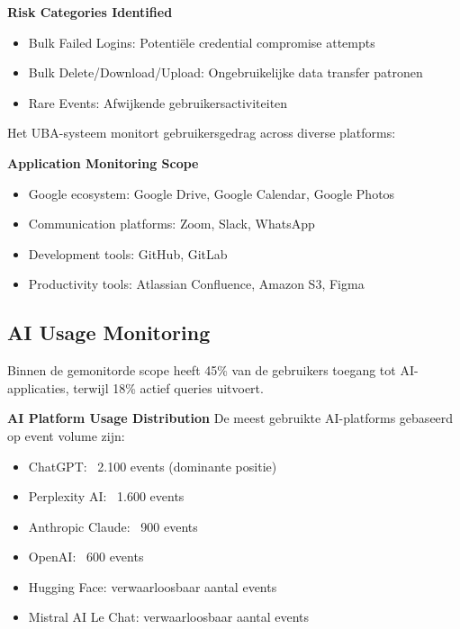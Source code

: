 \textbf{Risk Categories Identified}
\begin{itemize}
    \item Bulk Failed Logins: Potentiële credential compromise attempts
    \item Bulk Delete/Download/Upload: Ongebruikelijke data transfer patronen
    \item Rare Events: Afwijkende gebruikersactiviteiten
\end{itemize}

\vspace{2ex}

Het UBA-systeem monitort gebruikersgedrag across diverse platforms:

\textbf{Application Monitoring Scope}
\begin{itemize}
    \item Google ecosystem: Google Drive, Google Calendar, Google Photos
    \item Communication platforms: Zoom, Slack, WhatsApp
    \item Development tools: GitHub, GitLab
    \item Productivity tools: Atlassian Confluence, Amazon S3, Figma
\end{itemize}

\subsection{AI Usage Monitoring}
Binnen de gemonitorde scope heeft 45\% van de gebruikers toegang tot AI-applicaties, terwijl 18\% actief queries uitvoert.

\vspace{2ex}

\textbf{AI Platform Usage Distribution}
De meest gebruikte AI-platforms gebaseerd op event volume zijn:
\begin{itemize}
    \item ChatGPT: ~2.100 events (dominante positie)
    \item Perplexity AI: ~1.600 events
    \item Anthropic Claude: ~900 events
    \item OpenAI: ~600 events
    \item Hugging Face: verwaarloosbaar aantal events
    \item Mistral AI Le Chat: verwaarloosbaar aantal events
\end{itemize}

\vspace{2ex}

